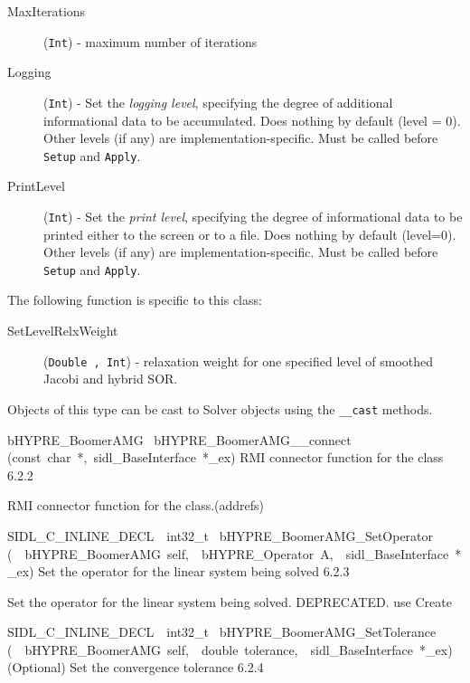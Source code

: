 \documentclass{article}
\begin{document}
\begin{cxxentry}
\begin{cxxentry}
\begin{cxxvariable}
\begin{cxxdoc}
\begin{description}
\item[MaxIterations] ({\tt Int}) - maximum number of iterations

\item[Logging] ({\tt Int}) - Set the {\it logging level}, specifying the
degree of additional informational data to be accumulated.  Does
nothing by default (level = 0).  Other levels (if any) are
implementation-specific.  Must be called before {\tt Setup}
and {\tt Apply}.

\item[PrintLevel] ({\tt Int}) - Set the {\it print level}, specifying the
degree of informational data to be printed either to the screen or
to a file.  Does nothing by default (level=0).  Other levels
(if any) are implementation-specific.  Must be called before
{\tt Setup} and {\tt Apply}.

\end{description}

The following function is specific to this class:

\begin{description}

\item[SetLevelRelxWeight] ({\tt Double , \tt Int}) -
relaxation weight for one specified level of smoothed Jacobi and hybrid SOR.

\end{description}

Objects of this type can be cast to Solver objects using the
{\tt \_\_cast} methods.
\end{cxxdoc}
\end{cxxvariable}
\begin{cxxfunction}
{bHYPRE\_BoomerAMG\ }
        {bHYPRE\_BoomerAMG\_\_connect}
        {(const\ char\ *,\ sidl\_BaseInterface\ *\_ex)}
        {
RMI connector function for the class}
        {6.2.2}
\begin{cxxdoc}

RMI connector function for the class.(addrefs)
\end{cxxdoc}
\end{cxxfunction}
\begin{cxxfunction}
{SIDL\_C\_INLINE\_DECL\ \ int32\_t\ }
        {bHYPRE\_BoomerAMG\_SetOperator}
        {(\ \ bHYPRE\_BoomerAMG\ self,\ \ bHYPRE\_Operator\ A,\ \ sidl\_BaseInterface\ *\_ex)}
        {
Set the operator for the linear system being solved}
        {6.2.3}
\begin{cxxdoc}

Set the operator for the linear system being solved.
DEPRECATED.  use Create
\end{cxxdoc}
\end{cxxfunction}
\begin{cxxfunction}
{SIDL\_C\_INLINE\_DECL\ \ int32\_t\ }
        {bHYPRE\_BoomerAMG\_SetTolerance}
        {(\ \ bHYPRE\_BoomerAMG\ self,\ \ double\ tolerance,\ \ sidl\_BaseInterface\ *\_ex)}
        {
(Optional) Set the convergence tolerance}
        {6.2.4}
\begin{cxxdoc}


\end{cxxdoc}
\end{cxxfunction}
\end{cxxentry}
\end{cxxentry}
\end{document}
